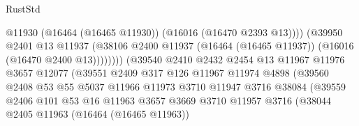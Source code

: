 \begin{lexlean}{RustStd}
\begin{coremodule}
                                              @11930
                                              (@16464 (@16465 @11930))
                                              (@16016 (@16470 @2393 @13))))
                                          (@39950
                                            @2401
                                            @13
                                            @11937
                                            (@38106
                                              @2400
                                              @11937
                                              (@16464 (@16465 @11937))
                                              (@16016 (@16470 @2400 @13))))))))
                                  (@39540
                                    @2410
                                    @2432
                                    @2454
                                    @13
                                    @11967
                                    @11976
                                    @3657
                                    @12077
                                    (@39551
                                      @2409
                                      @317
                                      @126
                                      @11967
                                      @11974
                                      @4898
                                      (@39560
                                        @2408
                                        @53
                                        @55
                                        @5037
                                        @11966
                                        @11973
                                        @3710
                                        @11947
                                        @3716
                                        @38084
                                        (@39559
                                          @2406
                                          @101
                                          @53
                                          @16
                                          @11963
                                          @3657
                                          @3669
                                          @3710
                                          @11957
                                          @3716
                                          (@38044
                                            @2405
                                            @11963
                                            (@16464 (@16465 @11963))

\end{coremodule}
\end{lexlean}
